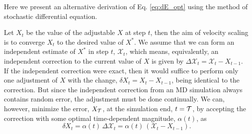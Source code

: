 \documentclass[reprint]{revtex4-1}
\begin{document}
Here we present an alternative derivation of Eq. \eqref{eq:dE_opt}
using the method of stochastic differential equation.

Let $X_t$ be the value of the adjustable $X$ at step $t$,
then the aim of velocity scaling is to converge $X_t$
to the desired value of $X^*$.
%
We assume that we can form an independent estimate of $X^*$
in step $t$, $\mathcal X_t$,
which means, equivalently, an independent correction
to the current value of $X$ is given by
$\Delta \mathcal X_t = \mathcal X_t - X_{t-1}$.
%
%
If the independent correction were exact,
then it would suffice to perform
only one adjustment of $X$
with the change, $\delta X_t = X_t - X_{t-1}$,
being identical to the correction.
%
But since
the independent correction from an MD simulation
always contains random error,
the adjustment must be done continually.
%
We can, however, minimize the error, $X_\mathcal T$,
at the simulation end, $t = \mathcal T$,
by accepting the correction with some
optimal time-dependent magnitude, $\alpha(t)$,
as
%
\begin{equation}
  \delta X_t
  =
  \alpha(t) \, \Delta \mathcal X_t
  =
  \alpha(t) \, \left( \mathcal X_t - X_{t - 1} \right)
  .
  \label{eq:Xupdate}
\end{equation}
%
\end{document}
